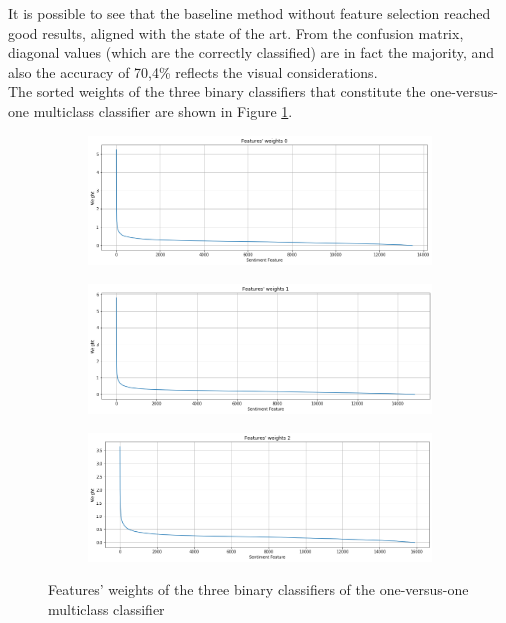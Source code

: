 It is possible to see that the baseline method without feature selection reached good results, aligned with the state of the art. From the confusion matrix, diagonal values (which are the correctly classified) are in fact the majority, and also the accuracy of 70,4\% reflects the visual considerations.\\
The sorted weights of the three binary classifiers that constitute the one-versus-one multiclass classifier are shown in Figure \ref{fig:svm-fs}.


\begin{figure}[H]
	\centering
	\begin{subfigure}{1\textwidth} %
		\includegraphics[width=\textwidth]{figures/conf_matrices/twitter_snt_svm/svm_fs_1.png}
	\end{subfigure}
	\begin{subfigure}{1\textwidth} %
		\includegraphics[width=\textwidth]{figures/conf_matrices/twitter_snt_svm/svm_fs_2.png}
	\end{subfigure}
	\begin{subfigure}{1\textwidth} %
		\includegraphics[width=\textwidth]{figures/conf_matrices/twitter_snt_svm/svm_fs_3.png}
	\end{subfigure}
	\caption{Features' weights of the three binary classifiers of the one-versus-one multiclass classifier} %
	\label{fig:svm-fs}
\end{figure}

